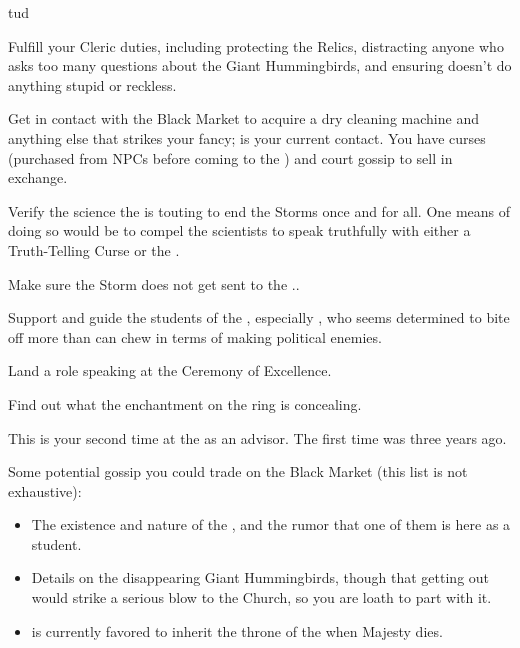tud\documentclass[char]{GL2020}
\begin{document}
\begin{itemz}
    \item Fulfill your Cleric duties, including protecting the Relics, distracting anyone who asks too many questions about the Giant Hummingbirds, and ensuring \cDisney{} doesn’t do anything stupid or reckless.
    \item Get in contact with the Black Market to acquire a dry cleaning machine and anything else that strikes your fancy; \cChupSecond{} is your current contact. You have curses (purchased from NPCs before coming to the \pSchool{}) and court gossip to sell in exchange.
    \item Verify the science the \pTech{} is touting to end the Storms once and for all. One means of doing so would be to compel the scientists to speak truthfully with either a Truth-Telling Curse or the \iLariat{}.
    \item Make sure the Storm does not get sent to the \pFarm{}..
    \item Support and guide the students of the \pFarm{}, especially \cLibAssist{}, who seems determined to bite off more than \cLibAssist{\they} can chew in terms of making political enemies.
    \item Land a role speaking at the Ceremony of Excellence.
    \item Find out what the enchantment on the ring is concealing.
\end{itemz}

\begin{itemz}[Notes]
    \item This is your second time at the \pSchool{} as an advisor. The first time was three years ago.
    \item Some potential gossip you could trade on the Black Market (this list is not exhaustive):
    \begin{itemize}
   	 \item The existence and nature of the \cDisneySect{}, and the rumor that one of them is here as a student.
   	 \item Details on the disappearing Giant Hummingbirds, though that getting out would strike a serious blow to the Church, so you are loath to part with it.
   	 \item \cPrince{} is currently favored to inherit the throne of the \pFarm{} when \cQueen{\Their} Majesty dies.
    \end{itemize}
\end{itemz}
\end{document}
